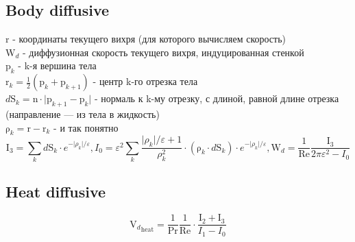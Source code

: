 \documentclass[a4paper,14pt]{extreport}
\newcommand{\br}[1]{\boldsymbol{\mathrm{#1}}}
\newcommand{\Reyn}{\text{Re}}
\newcommand{\Pran}{\text{Pr}}
\begin{document}
\subsection{Body diffusive}

$\br r$ - координаты текущего вихря (для которого вычисляем скорость) \\
$\br W_d$ - диффузионная скорость текущего вихря, индуцированная стенкой \\
$\br p_k$ - k-я вершина тела \\
$\br r_k = \frac{1}{2}(\br p_k + \br p_{k+1})$ - центр k-го отрезка тела \\
$d \br S_k = \br n \cdot\lvert\br p_{k+1} - \br p_k \rvert$ - нормаль к k-му отрезку, с длиной, равной длине отрезка (направление --- из тела в жидкость) \\
$\br{\rho}_k = \br r - \br r_k$ - и так понятно \\

\begin{equation*}
\br I_3 = {\sum\limits_k d\br S_k\cdot e^{-\lvert\rho_k\rvert/\varepsilon}},
I_0 = {\varepsilon^2\sum\limits_k \dfrac{\lvert\rho_k\rvert /\varepsilon +1}{\rho_k^2}
\cdot(\br\rho_k \cdot d\br S_k)\cdot e^{-\lvert\rho_k\rvert/\varepsilon}},
\br W_d = \dfrac{1}{\Reyn} \dfrac{\br I_3}{2\pi\varepsilon^2 - I_0}
\end{equation*}

\begin{center}\setlength\fboxsep{0pt}
\setlength\fboxrule{0.5pt}
\fbox{}
\end{center}

\subsection{Heat diffusive}

\begin{equation*}
{\br V_d}_\text{heat} = \frac {1}{\Pran}\frac{1}{\Reyn} \cdot\frac{\br I_2 + \br I_3}{I_1 - I_0}
\end{equation*}

\end{document}
